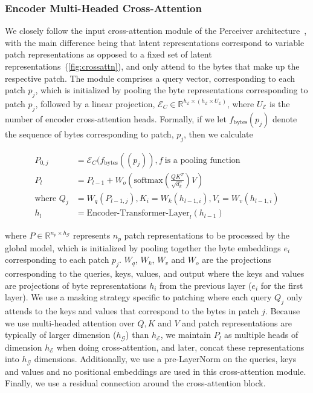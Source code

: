 \subsubsection{Encoder Multi-Headed Cross-Attention}
\label{sec:enc-cross-attn}
We closely follow the input cross-attention module of the Perceiver architecture~\citep{jaegle2021perceiver}, with the main difference being that latent representations correspond to variable patch representations as opposed to a fixed set of latent representations~(\autoref{fig:crossattn}), and only attend to the bytes that make up the respective patch. The module comprises a query vector, corresponding to each patch $p_j$, which is initialized by pooling the byte representations corresponding to patch $p_j$, followed by a linear projection, $\mathcal{E}_{C} \in \mathbb{R}^{h_{\mathcal{E}} \times (h_{\mathcal{E}} \times U_{\mathcal{E}})}$, where $U_{\mathcal{E}}$ is the number of encoder cross-attention heads. Formally, if we let $f_{\text{bytes}}(p_j)$ denote the sequence of bytes corresponding to patch, $p_j$, then we calculate

\begin{align}
P_{0,j} &= \mathcal{E}_{C}(f_\text{bytes}((p_j)), f~ \text{is a pooling function} \\
P_l &= P_{l-1} + W_o\left(\text{softmax}\left(\frac{QK^T}{\sqrt{d_k}}\right)V\right) \\
\text{where } Q_j &= W_q(P_{l-1,j}), K_i = W_k(h_{l-1,i}), V_i = W_v(h_{l-1,i}) \\
h_l &= \text{Encoder-Transformer-Layer}_l(h_{l-1})
\end{align}

where $P \in \mathbb{R}^{n_p \times h_{\mathcal{G}}}$ represents $n_p$ patch representations to be processed by the global model, which is initialized by pooling together the byte embeddings $e_i$ corresponding to each patch $p_j$. $W_q$, $W_k$, $W_v$ and $W_o$ are the projections corresponding to the queries, keys, values, and output where the keys and values are projections of byte representations $h_i$ from the previous layer ($e_i$ for the first layer). We use a masking strategy specific to patching where each query $Q_j$ only attends to the keys and values that correspond to the bytes in patch $j$. Because we use multi-headed attention over $Q, K$ and $V$ and patch representations are typically of larger dimension ($h_{\mathcal{G}}$) than $h_{\mathcal{E}}$, we maintain $P_l$ as multiple heads of dimension $h_{\mathcal{E}}$ when doing cross-attention, and later, concat these representations into $h_{\mathcal{G}}$ dimensions. Additionally, we use a pre-LayerNorm on the queries, keys and values and no positional embeddings are used in this cross-attention module. Finally, we use a residual connection around the cross-attention block. 

